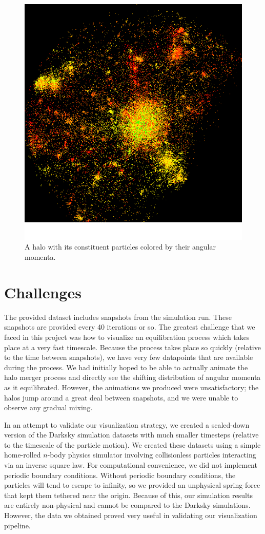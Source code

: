 \documentclass[12pt]{article}
\begin{document}
\begin{figure}[htp]
\centering
\includegraphics[width=0.5\columnwidth]{../figures/halo_particles.png}
\caption{A halo with its constituent particles colored by their angular momenta.}
\label{fig:halo_particles}
\end{figure}

\section{Challenges}
\label{sec:challenges}
The provided dataset includes snapshots from the simulation run. These
snapshots are provided every 40 iterations or so. The greatest challenge that
we faced in this project was how to visualize an equilibration process which
takes place at a very fast timescale. Because the process takes place so
quickly (relative to the time between snapshots), we have very few datapoints
that are available during the process. We had initially hoped to be able to
actually animate the halo merger process and directly see the shifting
distribution of angular momenta as it equilibrated. However, the animations we
produced were unsatisfactory; the halos jump around a great deal between
snapshots, and we were unable to observe any gradual mixing.

In an attempt to validate our visualization strategy, we created a scaled-down
version of the Darksky simulation datasets with much smaller timesteps
(relative to the timescale of the particle motion). We created these datasets
using a simple home-rolled $n$-body physics simulator involving collisionless
particles interacting via an inverse square law. For computational convenience,
we did not implement periodic boundary conditions. Without periodic boundary
conditions, the particles will tend to escape to infinity, so we provided an
unphysical spring-force that kept them tethered near the origin. Because of
this, our simulation results are entirely non-physical and cannot be compared
to the Darksky simulations. However, the data we obtained proved very useful in
validating our visualization pipeline.
\end{document}
